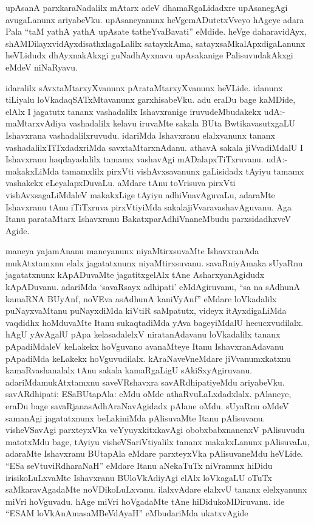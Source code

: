 \begin{artha}
upAsanA parxkaraNadalilx mAtarx adeV dhamaRgaLidadxre upAsanegAgi avugaLanunx ariyabeVku. upAsaneyanunx heVge\break mADutetxVveyo hAgeye adara Pala ``taM yathA yathA upAsate tatheYvaBavati'' eMdide. heVge daharavidAyx, shAMDilayxvidAyxdisathxlagaLalilx satayxkAma, satayxsaMkalApxdigaLanunx heVLidudx dhAyxnakAkxgi guNadhAyxnavu upAsakanige PalisuvudakAkxgi eMdeV niNaRyavu.
\end{artha}


\begin{artha}
idaralilx sAvxtaMtarxyXvanunx pArataMtarxyXvanunx heVLide. idanunx tiLiyalu loVkadaqSATxMtavanunx garxhisabeVku. adu eraDu bage kaMDide, elAlx I jagatutx tananx vashadalilx Ishavxranige iruvudeMbudakekx udA:- maMtarxvAdiya vashadalilx kelavu iruvaMte sakala BUta BwtikavasutxgaLU Ishavxrana vashadalilxruvudu. idariMda Ishavxranu elalxvanunx tananx vashadalilxTiTxdadxriMda savxtaMtarxnAdanu. athavA sakala jiVvadiMdalU  I Ishavxranu haqdayadalilx tamamx vashavAgi mADalapxTiTxruvanu. udA:- makakxLiMda tamamxlilx pirxVti vishAvxsavanunx gaLisidadx tAyiyu tamamx vashakekx eLeyalapxDuvaLu. aMdare tAnu toVrisuva pirxVti vishAvxsagaLiMdaleV makakxLige tAyiyu adhiVnavAguvaLu, adaraMte Ishavxranu tAnu iTiTxruva pirxVtiyiMda sakalajiVvaravashavAguvanu. Aga Itanu parataMtarx Ishavxranu BakatxparAdhiVnaneMbudu parxsidadhxveV Agide. 
\end{artha}


\begin{artha}
maneya yajamAnanu maneyanunx niyaMtirxsuvaMte IshavxranAda mukAtxtamxnu elalx jagatatxnunx niyaMtirxsuvanu. savaRniyAmaka sUyaRnu jagatatxnunx kApADuvaMte jagatitxgelAlx tAne AsharxyanAgidudx kApADuvanu. adariMda `savaRsayx adhipati' eMdAgiruvanu, ``sa na sAdhunA kamaRNA BUyAnf, noVEva asAdhunA kaniVyAnf'' eMdare loVkadalilx puNayxvaMtanu puNayxdiMda kiVtiR saMpatutx, videyx itAyxdigaLiMda vaqdidhx hoMduvaMte Itanu sukaqtadiMda yAva bageyiMdalU hecucxvudilalx. hAgU yAvAgalU pApa kelasadalelxV niratanAdavanu loVkadalilx tananx pApadiMdaleV keLakekx hoVguvano avanaMteye Itanu IshavxranAdavanu pApadiMda keLakekx hoVguvudilalx. kAraNaveVneMdare jiVvanumxkatxnu kamaRvashanalalx tAnu sakala kamaRgaLigU sAkiSxyAgiruvanu. adariMdamukAtxtamxnu saveVRshavxra savARdhipatiyeMdu ariyabeVku. savARdhipati: ESaBUtapAla: eMdu oMde athaRvuLaLxdadxlalx. pAlaneye, eraDu bage savaRjanasAdhAraNavAgidadx pAlane oMdu. sUyaRnu oMdeV samanAgi jagatatxnunx beLakiniMda pAlisuvaMte Itanu pAlisuvanu. visheVSavAgi parxteyxVka veYyuyxkitxkavAgi obobxbabxnanenxV  pAlisuvudu matotxMdu bage, tAyiyu visheVSariVtiyalilx tananx makakxLanunx pAlisuvaLu, adaraMte Ishavxranu BUtapAla eMdare parxteyxVka pAlisuvaneMdu heVLide. ``ESa seVtuviRdharaNaH'' eMdare Itanu aNekaTuTx niVranunx hiDidu irisikoLuLxvaMte Ishavxranu BUloVkAdiyAgi elAlx loVkagaLU oTuTx saMkaravAgadaMte noVDikoLuLxvanu. ilalxvAdare elalxvU tananx elelxyanunx miVri hoVguvadu. hAge miVri hoVgadaMte tAne hiDidukoMDiruvanu. ide ``ESAM loVkAnAmasaMBeVdAyaH'' eMbudariMda ukatxvAgide
\end{artha}

